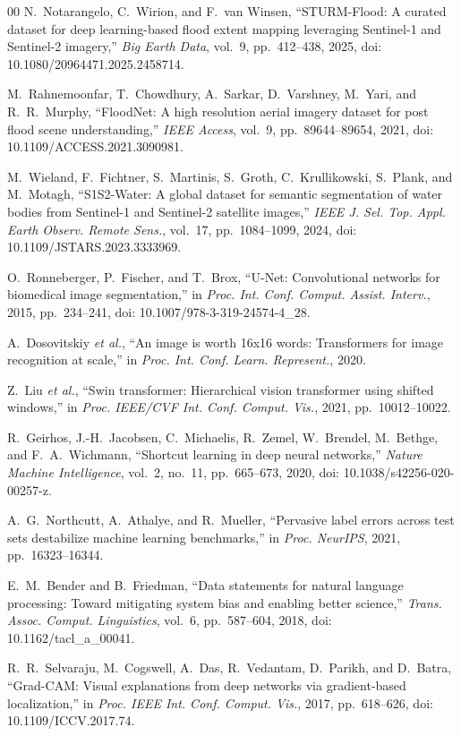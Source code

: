 \begin{thebibliography}{00}
 N.~Notarangelo, C.~Wirion, and F.~van Winsen, ``STURM-Flood: A curated
dataset for deep learning-based flood extent mapping leveraging Sentinel-1 and
Sentinel-2 imagery,'' \emph{Big Earth Data}, vol.~9, pp.~412--438, 2025,
doi: 10.1080/20964471.2025.2458714.

 M.~Rahnemoonfar, T.~Chowdhury, A.~Sarkar, D.~Varshney, M.~Yari, and
R.~R.~Murphy, ``FloodNet: A high resolution aerial imagery dataset for post flood
scene understanding,'' \emph{IEEE Access}, vol.~9, pp.~89644--89654, 2021,
doi: 10.1109/ACCESS.2021.3090981.

 M.~Wieland, F.~Fichtner, S.~Martinis, S.~Groth, C.~Krullikowski,
S.~Plank, and M.~Motagh, ``S1S2-Water: A global dataset for semantic segmentation
of water bodies from Sentinel-1 and Sentinel-2 satellite images,''
\emph{IEEE J. Sel. Top. Appl. Earth Observ. Remote Sens.}, vol.~17,
pp.~1084--1099, 2024, doi: 10.1109/JSTARS.2023.3333969.

 O.~Ronneberger, P.~Fischer, and T.~Brox, ``U-Net: Convolutional
networks for biomedical image segmentation,'' in \emph{Proc. Int. Conf. Comput.
Assist. Interv.}, 2015, pp.~234--241, doi: 10.1007/978-3-319-24574-4\_28.

 A.~Dosovitskiy \emph{et al.}, ``An image is worth 16x16 words:
Transformers for image recognition at scale,'' in \emph{Proc. Int. Conf. Learn.
Represent.}, 2020.

 Z.~Liu \emph{et al.}, ``Swin transformer: Hierarchical vision
transformer using shifted windows,'' in \emph{Proc. IEEE/CVF Int. Conf. Comput.
Vis.}, 2021, pp.~10012--10022.

 R.~Geirhos, J.-H.~Jacobsen, C.~Michaelis, R.~Zemel, W.~Brendel,
M.~Bethge, and F.~A.~Wichmann, ``Shortcut learning in deep neural networks,''
\emph{Nature Machine Intelligence}, vol.~2, no.~11, pp.~665--673, 2020,
doi: 10.1038/s42256-020-00257-z.

 A.~G.~Northcutt, A.~Athalye, and R.~Mueller, ``Pervasive label errors
across test sets destabilize machine learning benchmarks,'' in \emph{Proc.
NeurIPS}, 2021, pp.~16323--16344.

 E.~M.~Bender and B.~Friedman, ``Data statements for natural language
processing: Toward mitigating system bias and enabling better science,''
\emph{Trans. Assoc. Comput. Linguistics}, vol.~6, pp.~587--604, 2018,
doi: 10.1162/tacl\_a\_00041.

 R.~R.~Selvaraju, M.~Cogswell, A.~Das, R.~Vedantam,
D.~Parikh, and D.~Batra, ``Grad-CAM: Visual explanations from
deep networks via gradient-based localization,'' in \emph{Proc. IEEE Int. Conf.
Comput. Vis.}, 2017, pp.~618--626, doi: 10.1109/ICCV.2017.74.


\end{thebibliography}
